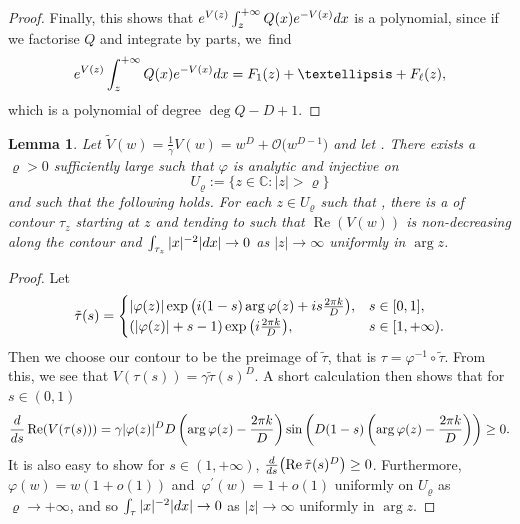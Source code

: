\documentclass[11pt]{article}
\numberwithin{equation}{section}
\numberwithin{equation}{section}
\newtheorem{Lemma}[Theorem]{Lemma}
\begin{document}
\begin{proof}
Finally, this shows that ${\rm e}^{V(z)} \int_z^{+\infty} Q(x) {\rm e}^{-V(x)} {\rm d}x$ is a polynomial, since if we factorise $Q$ and integrate by parts, we~find
\begin{equation*}
{\rm e}^{V(z)} \int_z^{+\infty} Q(x) {\rm e}^{-V(x)} {\rm d}x = F_1(z) + \dots + F_\ell(z),
\end{equation*}
which is a polynomial of degree $\deg Q - D + 1$.
\end{proof}

\begin{Lemma}\label{contour} Let $\tilde{V}(w) = \frac{1}{\gamma}V(w) = w^D + \mathcal{O}\big(w^{D-1}\big)$ and let . There exists a~${\varrho > 0}$ sufficiently large such that $\varphi$ is analytic and injective on
\begin{equation*}
U_\varrho := \{ z \in \mathbb{C}\colon |z| > \varrho \}
\end{equation*}
and such that the following holds. For each $z \in U_\varrho$ such that
,
there is a of contour $\tau_z$ starting at $z$ and tending to  such that $\operatorname{Re} (V(w))$ is non-decreasing along the contour and $\int_{\tau_z}|x|^{-2} |{\rm d}x| \to 0$ as $|z| \to \infty$ uniformly in $\operatorname{arg} z$.
\end{Lemma}
\begin{proof}
Let
\begin{equation*}
\tilde{\tau} (s) =
\begin{cases}
 |\varphi(z)| \exp\big({\rm i} (1-s)\arg \varphi(z) + {\rm i}s\frac{2\pi k}{D} \big), & s \in [0,1] ,\\
 (|\varphi(z)|+s-1) \exp\big({\rm i} \frac{2\pi k}{D} \big), & s \in [1,+\infty). \\
\end{cases}
\end{equation*}
Then we choose our contour to be the preimage of $\tilde{\tau}$, that is $\tau= \varphi^{-1} \circ \tilde{\tau}$. From this, we see that $V(\tau(s)) = \gamma \tilde{\tau}(s)^D$. A short calculation then shows that for $s \in (0,1)$
\begin{equation*}
\frac{\rm d}{{\rm d}s} \operatorname{Re} (V(\tau(s))) = \gamma |\varphi(z)|^D D \left( \arg \varphi(z) - \frac{2\pi k}{D} \right) \sin\left( D (1-s) \left( \arg \varphi(z) - \frac{2\pi k}{D} \right) \right) \geq 0.
\end{equation*}
It is also easy to show for $s \in (1,+\infty)$, $\frac{\rm d}{{\rm d}s} \bigl(\operatorname{Re} \tilde{\tau}(s)^D\bigr) \geq 0$. Furthermore, $\varphi(w) = w (1+o(1))$ and~${\varphi^\prime(w) = 1+o(1)}$ uniformly on $U_\varrho$ as $\varrho \to +\infty$, and so $\int_\tau |x|^{-2} |{\rm d}x| \to 0$ as $|z| \to \infty$ uniformly in $\operatorname{arg} z$.
\end{proof}
\end{document}
